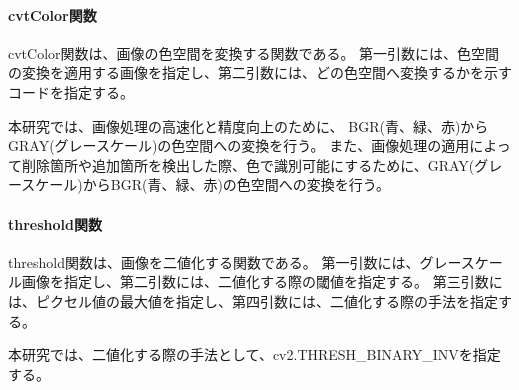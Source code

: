 \paragraph{cvtColor関数}
cvtColor関数は、画像の色空間を変換する関数である。
第一引数には、色空間の変換を適用する画像を指定し、第二引数には、どの色空間へ変換するかを示すコード\cite{ColorCode}を指定する。
\par
本研究では、画像処理の高速化と精度向上のために、
BGR(青、緑、赤)からGRAY(グレースケール)の色空間への変換を行う。
また、画像処理の適用によって削除箇所や追加箇所を検出した際、色で識別可能にするために、GRAY(グレースケール)からBGR(青、緑、赤)の色空間への変換を行う。
\paragraph{threshold関数}
threshold関数は、画像を二値化する関数である。
第一引数には、グレースケール画像を指定し、第二引数には、二値化する際の閾値を指定する。
第三引数には、ピクセル値の最大値を指定し、第四引数には、二値化する際の手法を指定する。
\par
本研究では、二値化する際の手法として、cv2.THRESH\_BINARY\_INV\cite{Threshold}を指定する。
